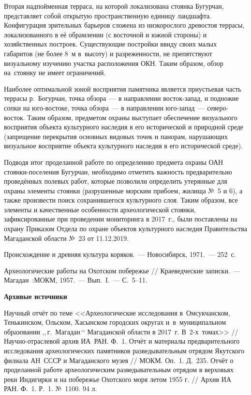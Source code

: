 Вторая надпойменная терраса, на которой локализована стоянка Бугурчан, представляет собой открытую пространственную единицу ландшафта. Конфигурация зрительных барьеров сложена из низкорослого древостоя террасы, локализованного в её обрамлении (с восточной и южной стороны) и хозяйственных построек. Существующие постройки ввиду своих малых габаритов (не более 8~м в~высоту) и разреженности, не препятствуют визуальному изучению участка расположения ОКН. Таким образом, обзор на~стоянку не имеет ограничений.

Наиболее оптимальной зоной восприятия памятника является приустьевая часть террасы р.~Богурчан, точка обзора~--- в направлении восток-запад, и подножие сопки на юго-востоке, точка обзора~--- в направлении юго-запад~--- северо-восток. Таким образом, предметом охраны выступает обеспечение визуального восприятия объекта культурного наследия в его исторической и природной среде (запрещение перекрытия основных видовых точек и панорам, нарушающих визуальное восприятие объекта культурного наследия в его исторической среде).

Подводя итог проделанной работе по определению предмета охраны ОАН стоянки-поселения Бугурчан, необходимо отметить важность предварительно проведённых полевых работ, которые позволили определить утерянные для охраны элементы стоянки (разрушенные морским прибоем, жилища №~5 и 6), а также произвести поиск сохранившегося культурного слоя. Таким образом, все элементы и качественные особенности археологической стоянки, зафиксированные при проведении мониторинга в 2017~г., были поставлены на охрану Приказом Отдела по охране объектов культурного наследия Правительства Магаданской области №~23 от 11.12.2019.
\clearpage
\begin{thebibliography}{99}

\bibitem{} Происхождение и древняя культура коряков.~--- Новосибирск, 1971.~--- 252~с.

\bibitem{} Археологические работы на Охотском побережье //  Краеведческие записки.~--- Магадан~:МОКМ, 1957.~--- Вып.~I.~--- С.~5--11.

\textbf{Архивые источники}

\bibitem{} Научный отчёт по теме <<Археологические исследования в~Омсукчанском, Тенькинском, Ольском, Хасынском городских округах и~в~муниципальном образовании ,,\,г.~Магадан\,‘‘ Магаданской области в 2017~г. В~2-х~томах>> // Научно-отраслевой архив ИА~РАН. Ф.~1.
\bibitem{} Отчёт и материалы предварительного исследования археологических памятников разведывательным отрядом Якутского филиала АН~СССР и Магаданского музея // МОКМ. Оп.~1. Д.~235.
\bibitem{} Отчёт о проделанной работе археологическим разведывательным отрядом в верховьях реки Индигирки и на побережье Охотского моря летом 1955 г. // Архив ИА РАН. Ф.~1. Р.~1. №~1100. 94 л.



\end{thebibliography}
